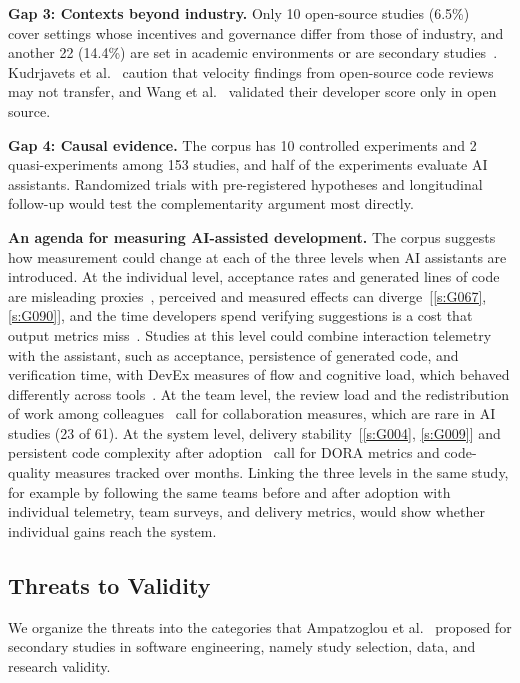 \documentclass[preprint,number]{elsarticle}
\newcounter{study}
\newcommand{\refG}[1]{\ref{s:#1}}
\begin{document}
\textbf{Gap 3: Contexts beyond industry.} Only 10 open-source studies (6.5\%)~\cite{P0162, P0028} cover settings whose incentives and governance differ from those of industry, and another 22 (14.4\%) are set in academic environments or are secondary studies~\cite{P1286}. Kudrjavets et al.~\cite{P0162} caution that velocity findings from open-source code reviews may not transfer, and Wang et al.~\cite{P0028} validated their developer score only in open source.

\textbf{Gap 4: Causal evidence.} The corpus has 10 controlled experiments and 2 quasi-experiments among 153 studies, and half of the experiments evaluate AI assistants. Randomized trials with pre-registered hypotheses and longitudinal follow-up would test the complementarity argument most directly.

\textbf{An agenda for measuring AI-assisted development.} The corpus suggests how measurement could change at each of the three levels when AI assistants are introduced. At the individual level, acceptance rates and generated lines of code are misleading proxies~\cite{P2028, P2100}, perceived and measured effects can diverge~[\refG{G067}, \refG{G090}], and the time developers spend verifying suggestions is a cost that output metrics miss~\cite{P2133}. Studies at this level could combine interaction telemetry with the assistant, such as acceptance, persistence of generated code, and verification time, with DevEx measures of flow and cognitive load, which behaved differently across tools~\cite{P0244}. At the team level, the review load and the redistribution of work among colleagues~\cite{P2030, P2034} call for collaboration measures, which are rare in AI studies (23 of 61). At the system level, delivery stability~[\refG{G004}, \refG{G009}] and persistent code complexity after adoption~\cite{P2032} call for DORA metrics and code-quality measures tracked over months. Linking the three levels in the same study, for example by following the same teams before and after adoption with individual telemetry, team surveys, and delivery metrics, would show whether individual gains reach the system.

\subsection{Threats to Validity}
\label{sec:threats}

We organize the threats into the categories that Ampatzoglou et al.~\cite{ampatzoglou2019threats} proposed for secondary studies in software engineering, namely study selection, data, and research validity.
\end{document}
